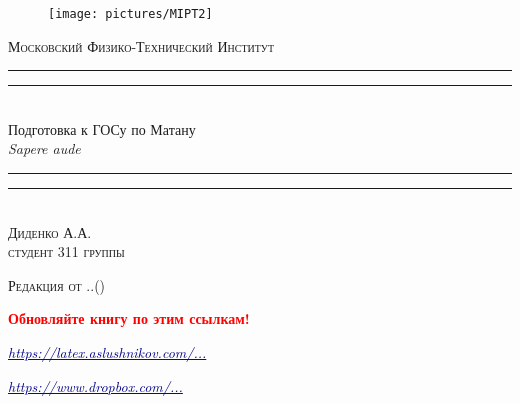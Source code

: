 \begin{titlepage}
\centering
\settowidth{\unitlength}{\LARGE\scshape Московский Физико-Технический Институт}

\begin{figure}[!h]
\center
\texttt{[image: pictures/MIPT2]}
\end{figure}
\vspace*{\baselineskip}
{\LARGE\scshape Московский Физико-Технический Институт}\\[\baselineskip]
\rule{\unitlength}{1.6pt}\vspace*{-\baselineskip}\vspace*{2pt}
\rule{\unitlength}{0.4pt}\\[1.8\baselineskip]
{\Huge Подготовка к ГОСу по Матану}\\[\baselineskip]
{\large \itshape Sapere aude}\\[0.7\baselineskip]
\rule{\unitlength}{0.4pt}\vspace*{-\baselineskip}\vspace{3.2pt}
\rule{\unitlength}{1.6pt}\\[\baselineskip]
{\Large\scshape Диденко А.А. \\ $ $\\студент 311 группы}\par
\vspace*{2\baselineskip}  




{\LARGE\scshape Редакция от \twodigit\day.\twodigit\month.\the\year \;(\currenttime)}\par %

\mbox{}

\textcolor{red}{\huge \textbf{Обновляйте книгу по этим ссылкам!}}

\mbox{}

\href{http://latex.aslushnikov.com/compile?git=https://github.com/DidenkoAndre/GOS_book&target=_main.tex}{\large \textcolor{darkblue}{\textit{https://latex.aslushnikov.com/...}}}

\mbox{}

\href{https://www.dropbox.com/sh/7e5mfj8q68o2ipp/AAD8XvpZhiJzFbEh_IeH305ia?dl=0&preview=GOSBook.pdf}{\large \textcolor{darkblue}{\textit{https://www.dropbox.com/...}}}


\end{titlepage}
